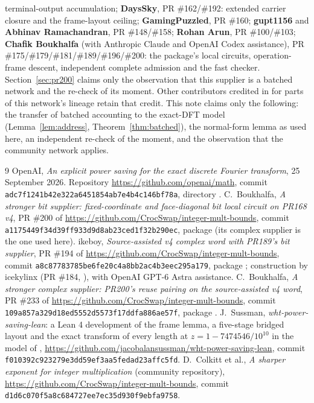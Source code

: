 \documentclass[11pt]{article}
\theoremstyle{definition}
\begin{document}
terminal-output accumulation; \textbf{DaysSky}, PR \#162/\#192: extended carrier
closure and the frame-layout ceiling; \textbf{GamingPuzzled}, PR \#160;
\textbf{gupt1156} and \textbf{Abhinav Ramachandran}, PR \#148/\#158;
\textbf{Rohan Arun}, PR \#100/\#103; \textbf{Chafik Boukhalfa} (with Anthropic
Claude and OpenAI Codex assistance), PR \#175/\#179/\#181/\#189/\#196/\#200: the
package's local circuits, operation-frame descent, independent complete
admission and the fast checker. Section~\ref{sec:pr200} claims only the
observation that this supplier is a batched network and the re-check of its
moment. Other contributors credited in \cite{cms} for parts of this network's lineage
retain that credit. This note claims only the following: the transfer of
batched accounting to the exact-DFT model (Lemma~\ref{lem:address},
Theorem~\ref{thm:batched}), the normal-form lemma as used here, an independent
re-check of the moment, and the observation that the community network applies.

\begin{thebibliography}{9}
 OpenAI, \emph{An explicit power saving for the exact discrete
  Fourier transform}, 25 September 2026. Repository
  \url{https://github.com/openai/math}, commit
  \texttt{adc7f1241b42e322a6451854ab7e4b4c146bf78a}, directory
  \allowbreak
  .
 C.~Boukhalfa, \emph{A stronger bit supplier: fixed-coordinate and
  face-diagonal bit local circuit on PR168 v4}, PR \#200 of
  \url{https://github.com/CrocSwap/integer-mult-bounds}, commit
  \texttt{a1175449f34d39ff933d9d8ab23ced1f32b290ec}, package
   (its complex supplier is the
  one used here).
 ikeboy, \emph{Source-assisted v4 complex word with PR189's bit
  supplier}, PR \#194 of \url{https://github.com/CrocSwap/integer-mult-bounds},
  commit \texttt{a8c87783785be6fe20c4a8bb2ac4b3eec295a179}, package
  ; construction by icekylinx (PR \#184,
  ), with OpenAI GPT-6 Astra assistance.
 C.~Boukhalfa, \emph{A stronger complex supplier: PR200's reuse
  pairing on the source-assisted v4 word}, PR \#233 of
  \url{https://github.com/CrocSwap/integer-mult-bounds}, commit
  \texttt{109a857a329d18ed5552d5573f17ddfa886ae57f}, package
  .
 J.~Sussman, \emph{wht-power-saving-lean}: a Lean 4 development of
  the frame lemma, a five-stage bridged layout and the exact transform of every
  length at $z=1-7474546/10^{10}$ in the model of \cite{oai-dft},
  \url{https://github.com/jacobalansussman/wht-power-saving-lean}, commit
  \texttt{f010392c923279e3dd59ef3aa5fedad23affc5fd}.
 D.~Colkitt et al., \emph{A sharper exponent for integer
  multiplication} (community repository),
  \url{https://github.com/CrocSwap/integer-mult-bounds}, commit
  \texttt{d1d6c070f5a8c684727ee7ec35d930f9ebfa9758}.
\end{thebibliography}
\end{document}
